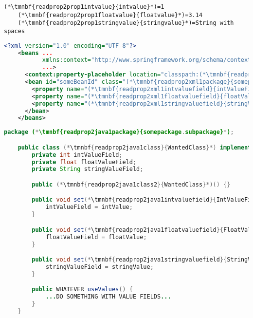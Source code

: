 \enlargethispage{20mm}
\thispagestyle{empty}
\begin{lstlisting}[title={A \textit{properties} file called \tmnbf{readprop2prop1filename}{\textit{setters.properties}}}]
    (*\tmnbf{readprop2prop1intvalue}{intvalue}*)=1
    (*\tmnbf{readprop2prop1floatvalue}{floatvalue}*)=3.14
    (*\tmnbf{readprop2prop1stringvalue}{stringvalue}*)=String with spaces
\end{lstlisting}
\begin{lstlisting}[language=XML, title={Configuration XML}]
    <?xml version="1.0" encoding="UTF-8"?>
    <beans ...
           xmlns:context="http://www.springframework.org/schema/context"
           ...>
      <context:property-placeholder location="classpath:(*\tmnbf{readprop2xml1filename}{setter.properties}[ForestGreen]*)" file-encoding="utf-8"/>
      <bean id="someBeanId" class="(*\tmnbf{readprop2xml1package}{somepackage.subpackage}[ForestGreen]*).(*\tmnbf{readprop2xml1class}{WantedClass}[ForestGreen]*)">
        <property name="(*\tmnbf{readprop2xml1intvaluefield}{intValueField}[ForestGreen]*)" value="(*\Sc*){(*\tmnbf{readprop2xml1intvalue}{intvalue}[ForestGreen]*)}"/>
        <property name="(*\tmnbf{readprop2xml1floatvaluefield}{floatValueField}[ForestGreen]*)" value="(*\Sc*){(*\tmnbf{readprop2xml1floatvalue}{floatvalue}[ForestGreen]*)}"/>
        <property name="(*\tmnbf{readprop2xml1stringvaluefield}{stringValueField}[ForestGreen]*)" value="(*\Sc*){(*\tmnbf{readprop2xml1stringvalue}{stringvalue}[ForestGreen]*)}"/>
      </bean>
    </beans>
\end{lstlisting}
\begin{lstlisting}[language=Java, title={Wanted class with the zero--parameter constructor and setter methods}]
    package (*\tmnbf{readprop2java1package}{somepackage.subpackage}*);

    public class (*\tmnbf{readprop2java1class}{WantedClass}*) implements WantedInterface {
        private int intValueField;
        private float floatValueField;
        private String stringValueField;

        public (*\tmnbf{readprop2java1class2}{WantedClass}*)() {}

        public void set(*\tmnbf{readprop2java1intvaluefield}{IntValueField}*)(int intValue) {
            intValueField = intValue;
        }

        public void set(*\tmnbf{readprop2java1floatvaluefield}{FloatValueField}*)(float floatValue) {
            floatValueField = floatValue;
        }

        public void set(*\tmnbf{readprop2java1stringvaluefield}{StringValueField}*)(string stringValue) {
            stringValueField = stringValue;
        }

        public WHATEVER useValues() {
            ...DO SOMETHING WITH VALUE FIELDS...
        }
    }
\end{lstlisting}
